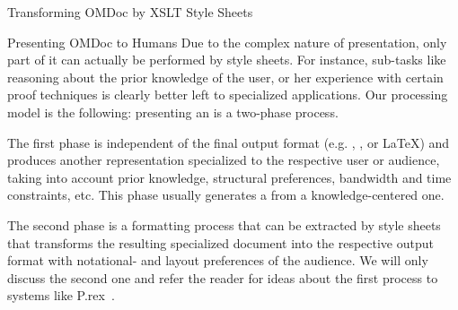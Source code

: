 \begin{tchapter}[id=transform-xsl,short=Transforming OMDoc]{Transforming OMDoc by XSLT Style Sheets}
\begin{tsection}[id=omdoc2pres]{Presenting OMDoc to Humans}
Due to the complex nature of {\omdoc} presentation, only part of it
can actually be performed by {\xslt} style sheets. For instance,
sub-tasks like reasoning about the prior knowledge of the user, or her
experience with certain proof techniques is clearly better left to
specialized applications. Our processing model is the following:
presenting an {\omdoc} is a two-phase process. 

The first phase is independent of the final output format (e.g. {\html}, {\mathml}, or
{\LaTeX}) and produces another {\omdoc} representation specialized to the respective user
or audience, taking into account prior knowledge, structural preferences, bandwidth and
time constraints, etc.  This phase usually generates a
{} from a knowledge-centered
one. 

The second phase is a formatting process that can be extracted by {\xslt} style sheets
that transforms the resulting specialized document into the respective output format with
notational- and layout preferences of the audience. We will only discuss the second one
and refer the reader for ideas about the first process to systems like
P.rex~\cite{Fiedler:ddaoeo01,FiedlerHoracek:aietlp01}.


\end{tsection}
\end{tchapter}
